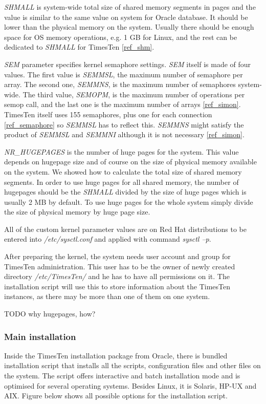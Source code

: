 \documentclass[11pt, letterpaper]{article}
\begin{document}
\emph{SHMALL} is system-wide total size of shared memory segments in pages and the value is similar to the same value on system for Oracle database. It should be lower than the physical memory on the system. Usually there should be enough space for OS memory operations, e.g. 1 GB for Linux, and the rest can be dedicated to \emph{SHMALL} for TimesTen \ref{ref_shm}.

\emph{SEM} parameter specifies kernel semaphore settings. \emph{SEM} itself is made of four values. The first value is \emph{SEMMSL}, the maximum number of semaphore per array. The second one, \emph{SEMMNS}, is the maximum number of semaphores system-wide. The third value, \emph{SEMOPM}, is the maximum number of operations per semop call, and the last one is the maximum number of arrays \ref{ref_simon}. TimesTen itself uses 155 semaphores, plus one for each connection \ref{ref_semaphore} so \emph{SEMMSL} has to reflect this. \emph{SEMMNS} might satisfy the product of \emph{SEMMSL} and \emph{SEMMNI} although it is not necessary \ref{ref_simon}.

\emph{NR\_HUGEPAGES} is the number of huge pages for the system. This value depends on hugepage size and of course on the size of physical memory available on the system. We showed how to calculate the total size of shared memory segments. In order to use huge pages for all shared memory, the number of hugepages should be the \emph{SHMALL} divided by the size of huge pages which is usually 2 MB by default. To use huge pages for the whole system simply divide the size of physical memory by huge page size.

All of the custom kernel parameter values are on Red Hat distributions to be entered into \emph{/etc/sysctl.conf} and applied with command \emph{sysctl –p}.

After preparing the kernel, the system needs user account and group for TimesTen administration. This user has to be the owner of newly created directory \emph{/etc/TimesTen/} and he has to have all permissions on it. The installation script will use this to store information about the TimesTen instances, as there may be more than one of them on one system.

TODO why hugepages, how?

\subsubsection{Main installation}

Inside the TimesTen installation package from Oracle, there is bundled installation script that installs all the scripts, configuration files and other files on the system. The script offers interactive and batch installation mode and is optimised for several operating systems. Besides Linux, it is Solaris, HP-UX and AIX. Figure below shows all possible options for the installation script.
\end{document}
